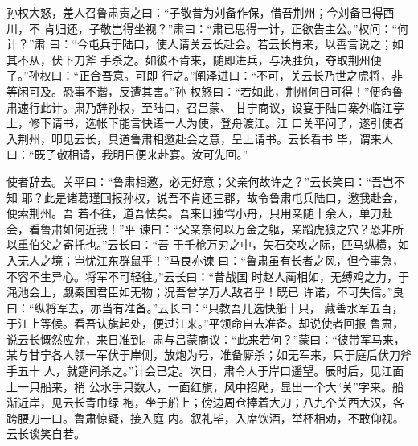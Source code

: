 孙权大怒，差人召鲁肃责之曰：“子敬昔为刘备作保，借吾荆州；今刘备已得西川，不
肯归还，子敬岂得坐视？”肃曰：“肃已思得一计，正欲告主公。”权问：“何计？”肃
曰：“今屯兵于陆口，使人请关云长赴会。若云长肯来，以善言说之；如其不从，伏下刀斧
手杀之。如彼不肯来，随即进兵，与决胜负，夺取荆州便了。”孙权曰：“正合吾意。可即
行之。”阐泽进曰：“不可，关云长乃世之虎将，非等闲可及。恐事不谐，反遭其害。”孙
权怒曰：“若如此，荆州何日可得！”便命鲁肃速行此计。肃乃辞孙权，至陆口，召吕蒙、
甘宁商议，设宴于陆口寨外临江亭上，修下请书，选帐下能言快语一人为使，登舟渡江。江
口关平问了，遂引使者入荆州，叩见云长，具道鲁肃相邀赴会之意，呈上请书。云长看书
毕，谓来人曰：“既子敬相请，我明日便来赴宴。汝可先回。”

使者辞去。关平曰：“鲁肃相邀，必无好意；父亲何故许之？”云长笑曰：“吾岂不知
耶？此是诸葛瑾回报孙权，说吾不肯还三郡，故令鲁肃屯兵陆口，邀我赴会，便索荆州。吾
若不往，道吾怯矣。吾来日独驾小舟，只用亲随十余人，单刀赴会，看鲁肃如何近我！”平
谏曰：“父亲奈何以万金之躯，亲蹈虎狼之穴？恐非所以重伯父之寄托也。”云长曰：“吾
于千枪万刃之中，矢石交攻之际，匹马纵横，如入无人之境；岂忧江东群鼠乎！”马良亦谏
曰：“鲁肃虽有长者之风，但今事急，不容不生异心。将军不可轻往。”云长曰：“昔战国
时赵人蔺相如，无缚鸡之力，于渑池会上，觑秦国君臣如无物；况吾曾学万人敌者乎！既已
许诺，不可失信。”良曰：“纵将军去，亦当有准备。”云长曰：“只教吾儿选快船十只，
藏善水军五百，于江上等候。看吾认旗起处，便过江来。”平领命自去准备。却说使者回报
鲁肃，说云长慨然应允，来日准到。肃与吕蒙商议：“此来若何？”蒙曰：“彼带军马来，
某与甘宁各人领一军伏于岸侧，放炮为号，准备厮杀；如无军来，只于庭后伏刀斧手五十
人，就筵间杀之。”计会已定。次日，肃令人于岸口遥望。辰时后，见江面上一只船来，梢
公水手只数人，一面红旗，风中招飐，显出一个大“关”字来。船渐近岸，见云长青巾绿
袍，坐于船上；傍边周仓捧着大刀；八九个关西大汉，各跨腰刀一口。鲁肃惊疑，接入庭
内。叙礼毕，入席饮酒，举杯相劝，不敢仰视。云长谈笑自若。

